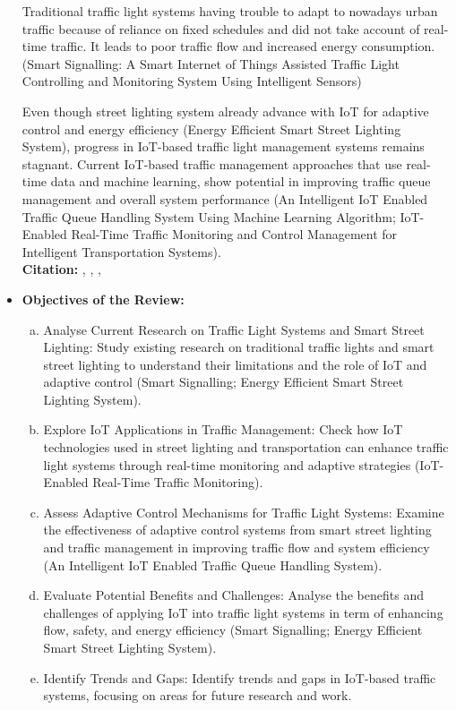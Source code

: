 \documentclass[12pt,a4paper]{article}
\begin{document}
\begin{itemize}
Traditional traffic light systems having trouble to adapt to nowadays urban traffic because of reliance on fixed schedules and did not take account of real-time traffic. It leads to poor traffic flow and increased energy consumption. (Smart Signalling: A Smart Internet of Things Assisted Traffic Light Controlling and Monitoring System Using Intelligent Sensors)

Even though street lighting system already advance with IoT for adaptive control and energy efficiency (Energy Efficient Smart Street Lighting System), progress in IoT-based traffic light management systems remains stagnant. Current IoT-based traffic management approaches that use real-time data and machine learning, show potential in improving traffic queue management and overall system performance (An Intelligent IoT Enabled Traffic Queue Handling System Using Machine Learning Algorithm; IoT-Enabled Real-Time Traffic Monitoring and Control Management for Intelligent Transportation Systems).\\

\textbf{Citation:} \cite{10568678}, \cite{10060318}, \cite{10384717}, \cite{9914294}

    \item \textbf{Objectives of the Review:}

\begin{enumerate}[(a)]
\item Analyse Current Research on Traffic Light Systems and Smart Street Lighting: Study existing research on traditional traffic lights and smart street lighting to understand their limitations and the role of IoT and adaptive control (Smart Signalling; Energy Efficient Smart Street Lighting System). 
\item Explore IoT Applications in Traffic Management: Check how IoT technologies used in street lighting and transportation can enhance traffic light systems through real-time monitoring and adaptive strategies (IoT-Enabled Real-Time Traffic Monitoring). 
\item Assess Adaptive Control Mechanisms for Traffic Light Systems: Examine the effectiveness of adaptive control systems from smart street lighting and traffic management in improving traffic flow and system efficiency (An Intelligent IoT Enabled Traffic Queue Handling System).
\item Evaluate Potential Benefits and Challenges: Analyse the benefits and challenges of applying IoT into traffic light systems in term of enhancing flow, safety, and energy efficiency (Smart Signalling; Energy Efficient Smart Street Lighting System).
\item Identify Trends and Gaps: Identify trends and gaps in IoT-based traffic systems, focusing on areas for future research and work.
\end{enumerate}


\end{itemize}
\end{document}
